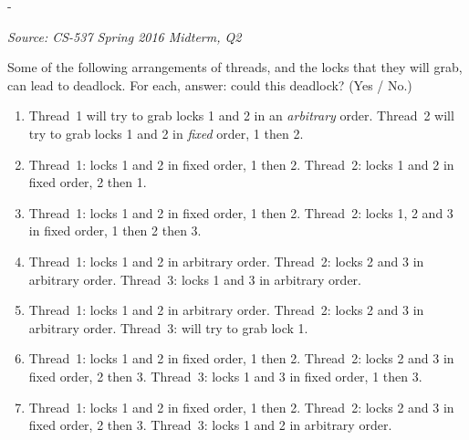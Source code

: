 \documentclass[11pt,a4paper]{article}
\makeatletter
\newcommand{\keepspace}[1]{\par\penalty-100\begingroup
  \setlength{\dimen@}{#1}\dimen@ii\pagegoal\advance\dimen@ii-\pagetotal
  \ifdim\dimen@>\dimen@ii\ifdim\dimen@ii>\z@\vfil\fi\break\fi\endgroup}
\newcounter{qn}[section]
\newenvironment{Qn}[4]{%
  \refstepcounter{qn}\keepspace{7\baselineskip}%
  \begin{tcolorbox}[qboxstyle, title={Q\thesection.\theqn\ \ [#1 \textbar\ #2]\ \ #4}]%
  {\footnotesize\color{g3}\textit{Source: #3}}\par\smallskip%
}{%
  \end{tcolorbox}%
}
\makeatother
\begin{document}
\begin{Qn}{Hard}{Lect 20}{CS-537 Spring 2016 Midterm, Q2}{Deadlock or not deadlock: seven lock-order arrangements}
Some of the following arrangements of threads, and the locks that they
will grab, can lead to deadlock. For each, answer: could this deadlock?
(Yes / No.)

\begin{enumerate}
  \item[(i)] Thread~1 will try to grab locks 1 and 2 in an \emph{arbitrary}
        order. Thread~2 will try to grab locks 1 and 2 in \emph{fixed}
        order, 1 then 2.
  \item[(ii)] Thread~1: locks 1 and 2 in fixed order, 1 then 2.
        Thread~2: locks 1 and 2 in fixed order, 2 then 1.
  \item[(iii)] Thread~1: locks 1 and 2 in fixed order, 1 then 2.
        Thread~2: locks 1, 2 and 3 in fixed order, 1 then 2 then 3.
  \item[(iv)] Thread~1: locks 1 and 2 in arbitrary order.
        Thread~2: locks 2 and 3 in arbitrary order.
        Thread~3: locks 1 and 3 in arbitrary order.
  \item[(v)] Thread~1: locks 1 and 2 in arbitrary order.
        Thread~2: locks 2 and 3 in arbitrary order.
        Thread~3: will try to grab lock 1.
  \item[(vi)] Thread~1: locks 1 and 2 in fixed order, 1 then 2.
        Thread~2: locks 2 and 3 in fixed order, 2 then 3.
        Thread~3: locks 1 and 3 in fixed order, 1 then 3.
  \item[(vii)] Thread~1: locks 1 and 2 in fixed order, 1 then 2.
        Thread~2: locks 2 and 3 in fixed order, 2 then 3.
        Thread~3: locks 1 and 2 in arbitrary order.
\end{enumerate}
\end{Qn}
\end{document}
